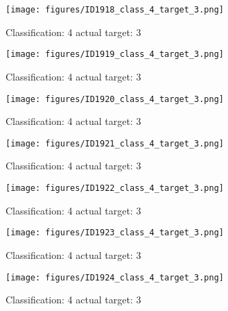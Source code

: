 \begin{figure}[h!]
\begin{center}
\texttt{[image: figures/ID1918\_class\_4\_target\_3.png]}
\end{center}
\caption{ Classification: 4 actual target: 3}
\label{fig:ID1918_class_4_target_3}
\end{figure}
\begin{figure}[h!]
\begin{center}
\texttt{[image: figures/ID1919\_class\_4\_target\_3.png]}
\end{center}
\caption{ Classification: 4 actual target: 3}
\label{fig:ID1919_class_4_target_3}
\end{figure}
\begin{figure}[h!]
\begin{center}
\texttt{[image: figures/ID1920\_class\_4\_target\_3.png]}
\end{center}
\caption{ Classification: 4 actual target: 3}
\label{fig:ID1920_class_4_target_3}
\end{figure}
\begin{figure}[h!]
\begin{center}
\texttt{[image: figures/ID1921\_class\_4\_target\_3.png]}
\end{center}
\caption{ Classification: 4 actual target: 3}
\label{fig:ID1921_class_4_target_3}
\end{figure}
\begin{figure}[h!]
\begin{center}
\texttt{[image: figures/ID1922\_class\_4\_target\_3.png]}
\end{center}
\caption{ Classification: 4 actual target: 3}
\label{fig:ID1922_class_4_target_3}
\end{figure}
\begin{figure}[h!]
\begin{center}
\texttt{[image: figures/ID1923\_class\_4\_target\_3.png]}
\end{center}
\caption{ Classification: 4 actual target: 3}
\label{fig:ID1923_class_4_target_3}
\end{figure}
\begin{figure}[h!]
\begin{center}
\texttt{[image: figures/ID1924\_class\_4\_target\_3.png]}
\end{center}
\caption{ Classification: 4 actual target: 3}
\label{fig:ID1924_class_4_target_3}
\end{figure}
